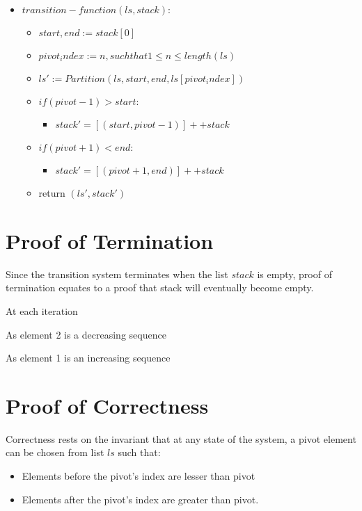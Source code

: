 \documentclass[12pt]{article}
\begin{document}
\begin{itemize}
\item []
$transition-function(ls, stack):$
	\begin{itemize}
	\item []
	$start, end := stack[0]$
	\item []
	$pivot_index := n, such that 1 \leq n \leq length(ls)$
	\item[]
	$ls' := Partition (ls, start, end, ls[pivot_index])$
	\item []
	$ if (pivot - 1) > start:$
		\begin{itemize}
		\item []
		$stack' = [(start, pivot - 1)] ++ stack$
		\end{itemize}
	\item []
	$ if (pivot + 1) < end:$
		\begin{itemize}
		\item []
		$stack' = [(pivot + 1, end)] ++ stack$
		\end{itemize}
	\item []
	return $(ls', stack')$
	\end{itemize}
\end{itemize}

\section{Proof of Termination}

Since the transition system terminates when the list $stack$ is empty, proof of termination equates to a proof that stack will eventually become empty.

At each iteration

As element 2 is a decreasing sequence

As element 1 is an increasing sequence

\section{Proof of Correctness}

Correctness rests on the invariant that at any state of the system, a pivot element can be chosen from list $ls$ such that:

\begin{itemize}
\item
Elements before the pivot's index are lesser than pivot
\item
Elements after the pivot's index are greater than pivot.
\end{itemize}
\end{document}
